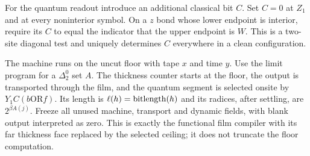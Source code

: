 For the quantum readout introduce an additional classical bit $C$.
Set $C=0$ at $Z_1$ and at every noninterior symbol. On a $z$ bond
whose lower endpoint is interior, require its $C$ to equal the
indicator that the upper endpoint is $W$. This is a two-site
diagonal test and uniquely determines $C$ everywhere in a clean
configuration.

The machine runs on the uncut floor with tape $x$ and time $y$.
Use the limit program for a $\Delta^0_2$ set $A$. The thickness
counter starts at the floor, the output is transported through the
film, and the quantum segment is selected onsite by
$Y_1C(b\mathbin{\mathrm{OR}}f)$. Its length is
$\ell(h)=\operatorname{bitlength}(h)$ and its radices, after settling, are
$2^{\beta A(j)}$. Freeze all unused machine, transport and dynamic
fields, with blank output interpreted as zero. This is exactly the
functional film compiler with its far thickness face replaced by
the selected ceiling; it does not truncate the floor computation.

